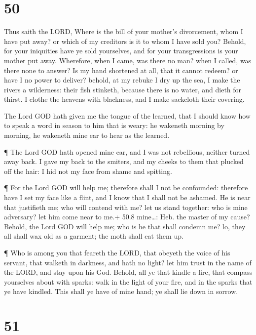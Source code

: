 \hypertarget{section-49}{%
\section{50}\label{section-49}}

 Thus saith the LORD, Where is the bill of your mother's
divorcement, whom I have put away? or which of my creditors is it to
whom I have sold you? Behold, for your iniquities have ye sold
yourselves, and for your transgressions is your mother put away.
 Wherefore, when I came, was there no man? when I called,
was there none to answer? Is my hand shortened at all, that it cannot
redeem? or have I no power to deliver? behold, at my rebuke I dry up the
sea, I make the rivers a wilderness: their fish stinketh, because there
is no water, and dieth for thirst.  I clothe the heavens
with blackness, and I make sackcloth their covering.

 The Lord GOD hath given me the tongue of the learned, that
I should know how to speak a word in season to him that is weary: he
wakeneth morning by morning, he wakeneth mine ear to hear as the
learned.

 ¶ The Lord GOD hath opened mine ear, and I was not
rebellious, neither turned away back.  I gave my back to the
smiters, and my cheeks to them that plucked off the hair: I hid not my
face from shame and spitting.

 ¶ For the Lord GOD will help me; therefore shall I not be
confounded: therefore have I set my face like a flint, and I know that I
shall not be ashamed.  He is near that justifieth me; who
will contend with me? let us stand together: who is mine adversary? let
him come near to me.+ 50.8 mine\ldots: Heb. the master of my cause?
 Behold, the Lord GOD will help me; who is he that shall
condemn me? lo, they all shall wax old as a garment; the moth shall eat
them up.

 ¶ Who is among you that feareth the LORD, that obeyeth the
voice of his servant, that walketh in darkness, and hath no light? let
him trust in the name of the LORD, and stay upon his God. 
Behold, all ye that kindle a fire, that compass yourselves about with
sparks: walk in the light of your fire, and in the sparks that ye have
kindled. This shall ye have of mine hand; ye shall lie down in sorrow.

\hypertarget{section-50}{%
\section{51}\label{section-50}}

